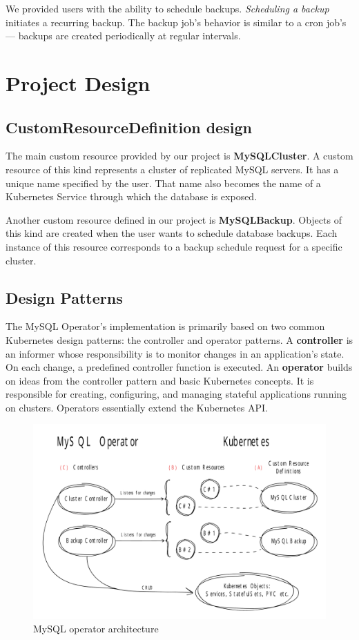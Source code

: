 We provided users with the ability to schedule backups. \textit{Scheduling a backup} initiates a
recurring backup. The backup job’s behavior is similar to a cron job’s --- backups are created
periodically at regular intervals.

\section{Project Design}

\subsection{CustomResourceDefinition design}
The main custom resource provided by our project is \textbf{MySQLCluster}. A custom resource of this kind
represents a cluster of replicated MySQL servers. It has a unique name specified by the user.
That name also becomes the name of a Kubernetes Service through which the database is exposed.

Another custom resource defined in our project is \textbf{MySQLBackup}. Objects of this kind are created when
the user wants to schedule database backups. Each instance of this resource corresponds to a backup
schedule request for a specific cluster.

\subsection{Design Patterns}
The MySQL Operator’s implementation is primarily based on two common Kubernetes design patterns:
the controller and operator patterns. A \textbf{controller} is an informer whose responsibility is
to monitor changes in an application’s state. On each change, a predefined controller function is
executed. An \textbf{operator} builds on ideas from the controller pattern and basic Kubernetes
concepts. It is responsible for creating, configuring, and managing stateful applications running on
clusters. Operators essentially extend the Kubernetes API.

\begin{figure}[!ht]
    \centering
    \includegraphics[width=1\textwidth, angle=0]{img/Design.pdf}
    \caption{MySQL operator architecture}
    \label{fig:design}
\end{figure}

